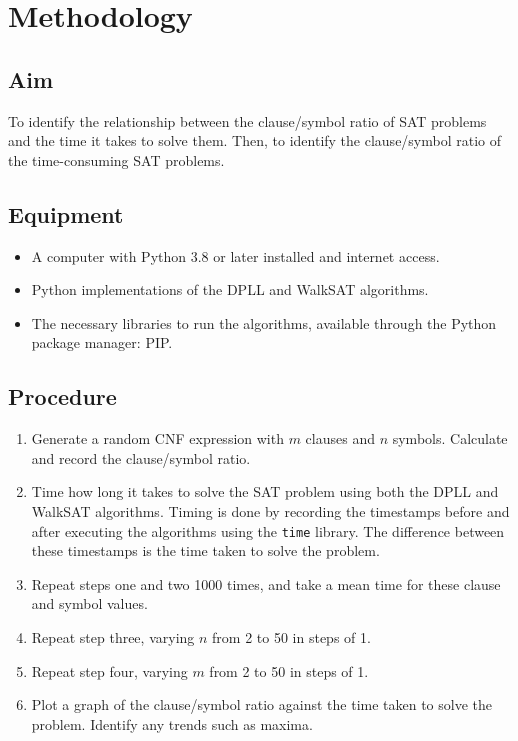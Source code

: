 \documentclass{article}
\begin{document}
    \section{Methodology}

    \subsection{Aim}
    To identify the relationship between the clause/symbol ratio of SAT problems and the time it takes to solve them. Then, to identify the clause/symbol ratio of the time-consuming SAT problems.

    \subsection{Equipment}
    \begin{itemize}
        \item A computer with Python 3.8\supercite{python-lang} or later installed and internet access.
        \item Python implementations of the DPLL and WalkSAT algorithms.
        \item The necessary libraries to run the algorithms, available through the Python package manager: PIP.
    \end{itemize}

    \subsection{Procedure}
    \begin{enumerate}
        \item Generate a random CNF expression with $m$ clauses and $n$ symbols. Calculate and record the clause/symbol ratio.
        \item Time how long it takes to solve the SAT problem using both the DPLL and WalkSAT algorithms. Timing is done by recording the timestamps before and after executing the algorithms using the \texttt{time} library. The difference between these timestamps is the time taken to solve the problem.
        \item Repeat steps one and two 1000 times, and take a mean time for these clause and symbol values.
        \item Repeat step three, varying $n$ from 2 to 50 in steps of 1.
        \item Repeat step four, varying $m$ from 2 to 50 in steps of 1.
        \item Plot a graph of the clause/symbol ratio against the time taken to solve the problem. Identify any trends such as maxima.
    \end{enumerate}
\end{document}
